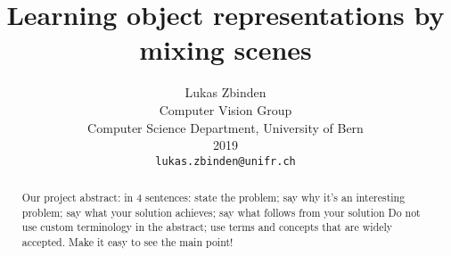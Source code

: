 \documentclass[12pt,a4paper]{article}
\begin{document}
\title{Learning object representations by mixing scenes}

\author{Lukas Zbinden\\
Computer Vision Group\\
Computer Science Department, University of Bern\\ 
2019\\
{\tt\small lukas.zbinden@unifr.ch}
}

\maketitle

\begin{abstract}
   Our project 
   abstract: in 4 sentences: state the problem; say why it's an interesting problem; say what your solution achieves; say what follows from your solution
   Do not use custom terminology in the abstract;
use terms and concepts that are widely accepted. Make it easy to see the main point!

\end{abstract}


\newpage
\tableofcontents
\newpage
\listoffigures
\newpage

\end{document}
